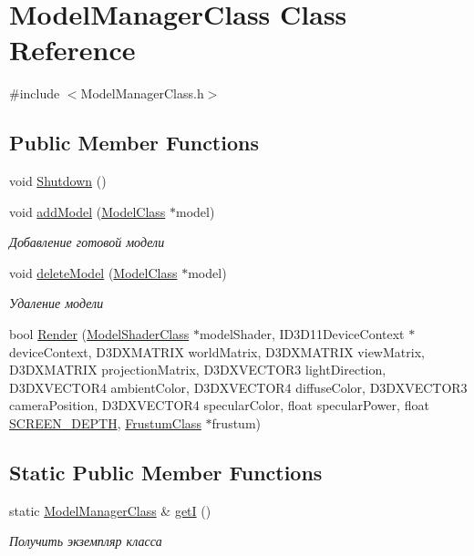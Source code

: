 \hypertarget{class_model_manager_class}{}\section{Model\+Manager\+Class Class Reference}
\label{class_model_manager_class}


{\ttfamily \#include $<$Model\+Manager\+Class.\+h$>$}

\subsection*{Public Member Functions}
\begin{DoxyCompactItemize}
\item 
void \hyperlink{class_model_manager_class_a977c171d2c1dab58aa64cad8bc5e5398}{Shutdown} ()
\item 
void \hyperlink{class_model_manager_class_a16eb12589fefbed876d9b71a3acfeef6}{add\+Model} (\hyperlink{class_model_class}{Model\+Class} $\ast$model)
\begin{DoxyCompactList}\small\item\em Добавление готовой модели \end{DoxyCompactList}\item 
void \hyperlink{class_model_manager_class_a00347e56781ac242aba4f72f0c27dd5f}{delete\+Model} (\hyperlink{class_model_class}{Model\+Class} $\ast$model)
\begin{DoxyCompactList}\small\item\em Удаление модели \end{DoxyCompactList}\item 
bool \hyperlink{class_model_manager_class_adb100d82bc2f2aff2eaab4a453c5b0bf}{Render} (\hyperlink{class_model_shader_class}{Model\+Shader\+Class} $\ast$model\+Shader, I\+D3\+D11\+Device\+Context $\ast$device\+Context, D3\+D\+X\+M\+A\+T\+R\+IX world\+Matrix, D3\+D\+X\+M\+A\+T\+R\+IX view\+Matrix, D3\+D\+X\+M\+A\+T\+R\+IX projection\+Matrix, D3\+D\+X\+V\+E\+C\+T\+O\+R3 light\+Direction, D3\+D\+X\+V\+E\+C\+T\+O\+R4 ambient\+Color, D3\+D\+X\+V\+E\+C\+T\+O\+R4 diffuse\+Color, D3\+D\+X\+V\+E\+C\+T\+O\+R3 camera\+Position, D3\+D\+X\+V\+E\+C\+T\+O\+R4 specular\+Color, float specular\+Power, float \hyperlink{_graphics_class_8h_ae4d41ac39678c64d2ef730cecc77cc64}{S\+C\+R\+E\+E\+N\+\_\+\+D\+E\+P\+TH}, \hyperlink{class_frustum_class}{Frustum\+Class} $\ast$frustum)
\end{DoxyCompactItemize}
\subsection*{Static Public Member Functions}
\begin{DoxyCompactItemize}
\item 
static \hyperlink{class_model_manager_class}{Model\+Manager\+Class} \& \hyperlink{class_model_manager_class_af547c3196870450233785417d3380b03}{getI} ()
\begin{DoxyCompactList}\small\item\em Получить экземпляр класса \end{DoxyCompactList}\end{DoxyCompactItemize}
